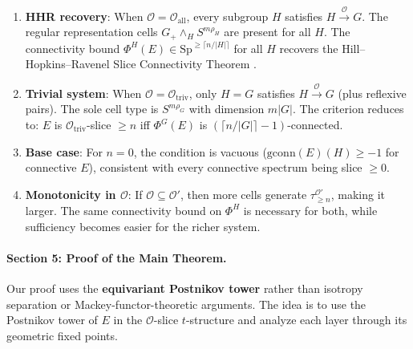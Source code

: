 \begin{remark}\label{rem:p5-checks}
\begin{enumerate}
  \item \textbf{HHR recovery}: When $\mathcal{O} = \mathcal{O}_{\mathrm{all}}$,
    every subgroup $H$ satisfies $H \xrightarrow{\mathcal{O}} G$.
    The regular representation cells $G_+ \wedge_H S^{m\rho_H}$ are
    present for all $H$. The connectivity bound
    $\Phi^H(E) \in \mathrm{Sp}^{\geq \lceil n/|H| \rceil}$ for all $H$
    recovers the Hill--Hopkins--Ravenel Slice Connectivity Theorem
    \cite[Theorem 4.42]{HHR}.
  \item \textbf{Trivial system}: When $\mathcal{O} = \mathcal{O}_{\mathrm{triv}}$,
    only $H = G$ satisfies $H \xrightarrow{\mathcal{O}} G$
    (plus reflexive pairs). The sole cell type is
    $S^{m\rho_G}$ with dimension $m|G|$. The criterion reduces to:
    $E$ is $\mathcal{O}_{\mathrm{triv}}$-slice $\geq n$ iff
    $\Phi^G(E)$ is $(\lceil n/|G|\rceil - 1)$-connected.
  \item \textbf{Base case}: For $n = 0$, the condition is vacuous
    ($\mathrm{gconn}(E)(H) \geq -1$ for connective $E$), consistent
    with every connective spectrum being slice $\geq 0$.
  \item \textbf{Monotonicity in $\mathcal{O}$}: If
    $\mathcal{O} \subseteq \mathcal{O}'$, then more cells generate
    $\tau_{\geq n}^{\mathcal{O}'}$, making it larger. The same
    connectivity bound on $\Phi^H$ is necessary for both, while
    sufficiency becomes easier for the richer system.
\end{enumerate}
\end{remark}


\paragraph{Section 5: Proof of the Main Theorem.}

Our proof uses the \textbf{equivariant Postnikov tower} rather than
isotropy separation or Mackey-functor-theoretic arguments. The idea is
to use the Postnikov tower of $E$ in the $\mathcal{O}$-slice
$t$-structure and analyze each layer through its geometric fixed points.

